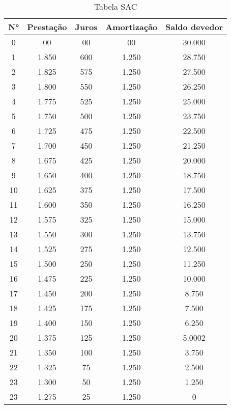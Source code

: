 \documentclass[report]{uftex}
\begin{document}
\begin{itemize}
	\begin{table}[h]
	\centering
	\begin{tabular}{c|c|c|c|c}
		\hline
		N° & Prestação & Juros & Amortização & Saldo devedor \\ 
		\hline
		0 & 00 & 00 & 00 & 30.000 \\
		\hline
		1 & 1.850 & 600 & 1.250
		& 28.750 \\
		\hline
		2 & 1.825 & 575 & 1.250
		& 27.500 \\
		\hline
		3 & 1.800 & 550 & 1.250
		& 26.250 \\
		\hline
		4 & 1.775 & 525 & 1.250
		& 25.000 \\
		\hline
		5 & 1.750 & 500 & 1.250
		&  23.750\\
		\hline
		6 & 1.725 & 475 & 1.250
		& 22.500 \\
		\hline
		7 & 1.700 & 450 & 1.250
		& 21.250 \\
		\hline
		8 & 1.675 & 425 & 1.250
		& 20.000 \\
		\hline
		9 & 1.650 & 400 & 1.250
		& 18.750 \\
		\hline
		10 & 1.625 & 375 & 1.250
		& 17.500 \\
		\hline
		11 & 1.600 & 350 & 1.250
		& 16.250 \\
		\hline
		12 & 1.575 & 325 & 1.250
		& 15.000 \\
		\hline
		13 & 1.550 & 300 & 1.250
		& 13.750 \\
		\hline
		14 & 1.525 & 275 & 1.250
		& 12.500 \\
		\hline
		15 & 1.500 & 250 & 1.250
		& 11.250 \\
		\hline
		16 & 1.475 & 225 & 1.250
		& 10.000 \\
		\hline
		17 & 1.450 & 200 & 1.250
		& 8.750 \\
		\hline
		18 & 1.425 & 175 & 1.250
		& 7.500 \\
		\hline
		19 & 1.400 & 150 & 1.250
		& 6.250 \\
		\hline
		20 & 1.375 & 125 & 1.250
		& 5.0002 \\
		\hline
		21 & 1.350 & 100 & 1.250
		& 3.750 \\
		\hline
		22 & 1.325 & 75 & 1.250
		& 2.500 \\
		\hline
		23 & 1.300 & 50 & 1.250
		&  1.250 \\
		\hline
		23 & 1.275 & 25 & 1.250
		& 0 \\
		\hline
	\end{tabular}
	\caption{Tabela SAC}
\end{table}	
	
	
\end{itemize}
\end{document}
